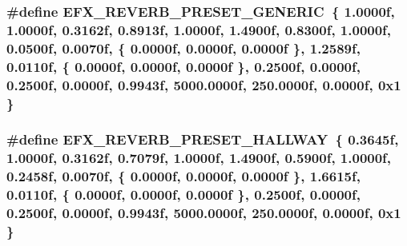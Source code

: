 \subsubsection[{\texorpdfstring{E\+F\+X\+\_\+\+R\+E\+V\+E\+R\+B\+\_\+\+P\+R\+E\+S\+E\+T\+\_\+\+G\+E\+N\+E\+R\+IC}{EFX_REVERB_PRESET_GENERIC}}]{\setlength{\rightskip}{0pt plus 5cm}\#define E\+F\+X\+\_\+\+R\+E\+V\+E\+R\+B\+\_\+\+P\+R\+E\+S\+E\+T\+\_\+\+G\+E\+N\+E\+R\+IC~\{ 1.\+0000f, 1.\+0000f, 0.\+3162f, 0.\+8913f, 1.\+0000f, 1.\+4900f, 0.\+8300f, 1.\+0000f, 0.\+0500f, 0.\+0070f, \{ 0.\+0000f, 0.\+0000f, 0.\+0000f \}, 1.\+2589f, 0.\+0110f, \{ 0.\+0000f, 0.\+0000f, 0.\+0000f \}, 0.\+2500f, 0.\+0000f, 0.\+2500f, 0.\+0000f, 0.\+9943f, 5000.\+0000f, 250.\+0000f, 0.\+0000f, 0x1 \}}\hypertarget{efx-presets_8h_a30c63b1f0ea6c1dab451ead2cce9574d}{}\label{efx-presets_8h_a30c63b1f0ea6c1dab451ead2cce9574d}
\subsubsection[{\texorpdfstring{E\+F\+X\+\_\+\+R\+E\+V\+E\+R\+B\+\_\+\+P\+R\+E\+S\+E\+T\+\_\+\+H\+A\+L\+L\+W\+AY}{EFX_REVERB_PRESET_HALLWAY}}]{\setlength{\rightskip}{0pt plus 5cm}\#define E\+F\+X\+\_\+\+R\+E\+V\+E\+R\+B\+\_\+\+P\+R\+E\+S\+E\+T\+\_\+\+H\+A\+L\+L\+W\+AY~\{ 0.\+3645f, 1.\+0000f, 0.\+3162f, 0.\+7079f, 1.\+0000f, 1.\+4900f, 0.\+5900f, 1.\+0000f, 0.\+2458f, 0.\+0070f, \{ 0.\+0000f, 0.\+0000f, 0.\+0000f \}, 1.\+6615f, 0.\+0110f, \{ 0.\+0000f, 0.\+0000f, 0.\+0000f \}, 0.\+2500f, 0.\+0000f, 0.\+2500f, 0.\+0000f, 0.\+9943f, 5000.\+0000f, 250.\+0000f, 0.\+0000f, 0x1 \}}\hypertarget{efx-presets_8h_a5e2ae3a6889f4c3cce4a7fbffa6f5959}{}\label{efx-presets_8h_a5e2ae3a6889f4c3cce4a7fbffa6f5959}
